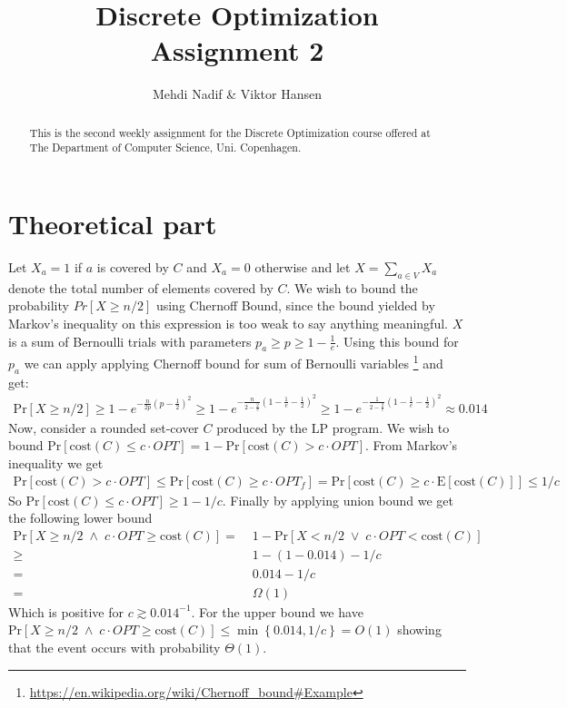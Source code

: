 \documentclass[12pt]{article}
\begin{document}
\nocite{*}


\title{Discrete Optimization \\
       Assignment 2}

\author{Mehdi Nadif \& Viktor Hansen}

\maketitle

\begin{abstract}
  This is the second weekly assignment for the Discrete Optimization course offered at The Department of Computer Science, Uni. Copenhagen.
\end{abstract}

\pagebreak

\section*{Theoretical part}
Let $X_a = 1$ if $a$ is covered by $C$ and $X_a=0$ otherwise and let $X=\sum_{a \in V} X_a$ denote the total number of elements covered by $C$. We wish to bound the probability $Pr\left[ X \geq n/2 \right]$ using Chernoff Bound, since the bound yielded by Markov's inequality on this expression is too weak to say anything meaningful. $X$ is a sum of Bernoulli trials with parameters $p_a  \geq p \geq  1-\frac{1}{e}$. Using this bound for $p_a$ we can apply applying Chernoff bound for sum of Bernoulli variables \footnote{\url{https://en.wikipedia.org/wiki/Chernoff_bound\#Example}} and get:
\begin{align*}
\text{Pr}[X \geq n/2] \geq 1 - e^{-\frac{n}{2p}\left( p-\frac{1}{2} \right)^2} \geq 1 - e^{-\frac{n}{2-\frac{2}{e}}\left( 1-\frac{1}{e}-\frac{1}{2} \right)^2} \geq 1 - e^{-\frac{1}{2-\frac{2}{e}}\left( 1-\frac{1}{e}-\frac{1}{2} \right)^2} \approx 0.014
\end{align*}
Now, consider a rounded set-cover $C$ produced by the LP program. We wish to bound $\text{Pr}[\text{cost}(C) \leq c \cdot OPT ] = 1 - \text{Pr}[\text{cost}(C) > c \cdot OPT ] $. From Markov's inequality we get
\begin{align*}
\text{Pr}[\text{cost}(C) > c \cdot OPT ] \leq \text{Pr}[\text{cost}(C) \geq  c \cdot OPT_f ] = \text{Pr}[\text{cost}(C) \geq  c \cdot \text{E}[\text{cost}(C)] ] \leq 1/c
\end{align*}
So  $\text{Pr}[\text{cost}(C) \leq c \cdot OPT ] \geq 1-1/c$. Finally by applying union bound we get the following lower bound
\begin{align*}
\text{Pr}[X \geq n/2 \; \land \; c \cdot OPT \geq \text{cost}(C)] = & \; 1-\text{Pr}[X < n/2 \; \lor \; c \cdot OPT < \text{cost}(C)] \\
\geq &\;1 - (1 - 0.014) - 1/c \\
= & \; 0.014-1/c \\
= & \; \Omega(1)
\end{align*}
Which is positive for $c \gtrsim 0.014^{-1}$. For the upper bound we have $\text{Pr}[X \geq n/2 \; \land \; c \cdot OPT \geq \text{cost}(C)]  \leq \min \left\{ 0.014, 1/c \right\} = O(1)$ showing that the event occurs with  probability $\Theta(1)$.
\end{document}
